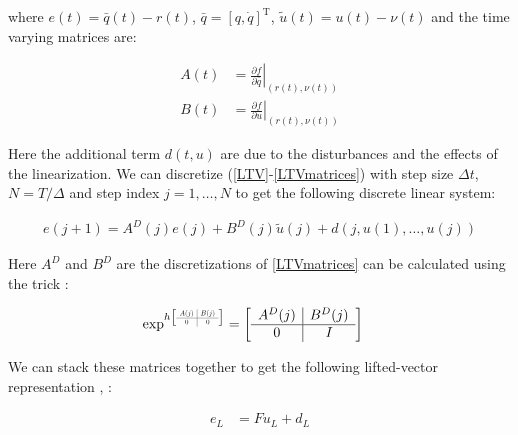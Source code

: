 \documentclass[10pt,a4paper]{article}
\newcommand\at[2]{\left.#1\right|_{#2}} %
\newcommand\scalemath[2]{\scalebox{#1}{\mbox{\ensuremath{\displaystyle #2}}}} %
\newcommand{\joint}{q} %
\newcommand{\state}{\bar{\joint}} %
\newcommand{\error}{e} %
\newcommand{\traj}{r} %
\newcommand{\linDist}{d} %
\newcommand{\sysInput}{u} %
\newcommand{\linInput}{\tilde{u}} %
\newcommand{\trjInput}{\nu} %
\newcommand{\dynamics}{f}
\begin{document}
where $\error(t) = \state(t) - \traj(t)$, $\state = [\joint,\dot{\joint}]^{\mathrm{T}}$, $\linInput(t) = \sysInput(t) - \trjInput(t)$ and the time varying matrices are:

\begin{equation}
\begin{aligned}
A(t) &= \at{\frac{\partial{\dynamics}}{\partial{\state}}}{(\traj(t),\trjInput(t))} \\
B(t) &= \at{\frac{\partial{\dynamics}}{\partial{\sysInput}}}{(\traj(t),\trjInput(t))}
\end{aligned}
\label{LTVmatrices}
\end{equation}

Here the additional term $\linDist(t,\sysInput)$ are due to the disturbances and the effects of the linearization. We can discretize (\ref{LTV}-\ref{LTVmatrices}) with step size $\Delta t$, $N = T/\Delta$ and step index $j = 1, \ldots, N$ to get the following discrete linear system:

\begin{equation}
\begin{aligned}
\error(j+1) = A^{D}(j)\error(j) + B^{D}(j)\linInput(j) + \linDist(j, \sysInput(1), \ldots, \sysInput(j))
\end{aligned}
\label{discreteLTV}
\end{equation}

Here $A^D$ and $B^D$ are the discretizations of \eqref{LTVmatrices} can be calculated using the trick \cite{Schoellig12}:

\begin{equation}
\begin{aligned}
\exp^{h
\left[
\scalemath{0.5}{
\begin{array}{c|c}
A(j) & B(j) \\ \hline
0 & 0
\end{array}}\right]}
&= 
\left[
\begin{array}{c|c}
A^{D}(j) & B^{D}(j) \\ \hline
0 & I
\end{array}\right] 
\end{aligned}
\label{discreteMatrices}
\end{equation}

We can stack these matrices together to get the following lifted-vector representation \cite{Bristow06}, \cite{Schoellig12}:

\begin{equation}
\begin{aligned}
\error_L &= F\sysInput_L + \linDist_L \\
\end{aligned}
\label{liftedLTV}
\end{equation}
\end{document}
